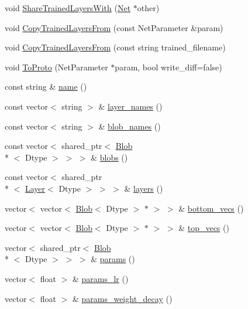 \begin{DoxyCompactItemize}
void \hyperlink{classcaffe_1_1_net_a01d1c1505ff1360de6aa14fa117279cc}{Share\+Trained\+Layers\+With} (\hyperlink{classcaffe_1_1_net}{Net} $\ast$other)
\item 
void \hyperlink{classcaffe_1_1_net_a4ac2b69748470f54d530bc5dfa05b9c3}{Copy\+Trained\+Layers\+From} (const Net\+Parameter \&param)
\item 
void \hyperlink{classcaffe_1_1_net_ad5e222ad89011558cee681133e5c610b}{Copy\+Trained\+Layers\+From} (const string trained\+\_\+filename)
\item 
void \hyperlink{classcaffe_1_1_net_a81de7f48c2ecb431496b2e70754e74fd}{To\+Proto} (Net\+Parameter $\ast$param, bool write\+\_\+diff=false)
\item 
const string \& \hyperlink{classcaffe_1_1_net_a101a9872250ffac595edb163b0c88e96}{name} ()
\item 
const vector$<$ string $>$ \& \hyperlink{classcaffe_1_1_net_a2daa2a72fe29bf58f14d8c7ab943ea9b}{layer\+\_\+names} ()
\item 
const vector$<$ string $>$ \& \hyperlink{classcaffe_1_1_net_a0a8dd2d0630a7fb5b35beb217ffd857a}{blob\+\_\+names} ()
\item 
const vector$<$ shared\+\_\+ptr$<$ \hyperlink{classcaffe_1_1_blob}{Blob}\\*
$<$ Dtype $>$ $>$ $>$ \& \hyperlink{classcaffe_1_1_net_a5fe377d90f21430b028c7cef1cd6ac2d}{blobs} ()
\item 
const vector$<$ shared\+\_\+ptr\\*
$<$ \hyperlink{classcaffe_1_1_layer}{Layer}$<$ Dtype $>$ $>$ $>$ \& \hyperlink{classcaffe_1_1_net_aa5185fed7df3fdd05e289459340571b3}{layers} ()
\item 
vector$<$ vector$<$ \hyperlink{classcaffe_1_1_blob}{Blob}$<$ Dtype $>$ $\ast$ $>$ $>$ \& \hyperlink{classcaffe_1_1_net_aa4e28420adc6c5c19e23ee1e3b131cca}{bottom\+\_\+vecs} ()
\item 
vector$<$ vector$<$ \hyperlink{classcaffe_1_1_blob}{Blob}$<$ Dtype $>$ $\ast$ $>$ $>$ \& \hyperlink{classcaffe_1_1_net_a4d145523a8596627f740b9adfd5ebef5}{top\+\_\+vecs} ()
\item 
vector$<$ shared\+\_\+ptr$<$ \hyperlink{classcaffe_1_1_blob}{Blob}\\*
$<$ Dtype $>$ $>$ $>$ \& \hyperlink{classcaffe_1_1_net_a59dccb44a585213886c0748bebc52303}{params} ()
\item 
vector$<$ float $>$ \& \hyperlink{classcaffe_1_1_net_a34018b12a617b908086ba869d05a2c7c}{params\+\_\+lr} ()
\item 
vector$<$ float $>$ \& \hyperlink{classcaffe_1_1_net_a2eafb0098fee6f41d70a6a7e8feef650}{params\+\_\+weight\+\_\+decay} ()

\end{DoxyCompactItemize}
